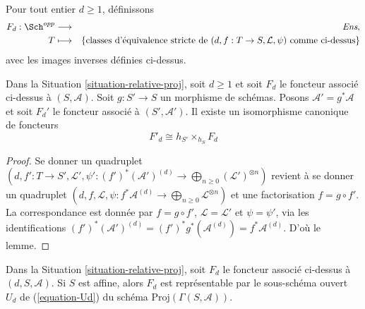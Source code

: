 \medskip\noindent
Pour tout entier $d \geq 1$, définissons
\begin{eqnarray*}
F_d : \Sch^{opp} & \longrightarrow & \textit{Ens}, \\
T & \longmapsto &
\{\text{classes d'équivalence stricte de }
(d, f : T \to S, \mathcal{L}, \psi)
\text{ comme ci-dessus}\}
\end{eqnarray*}
avec les images inverses définies ci-dessus.

\begin{lemma}
\label{lemma-proj-base-change}
Dans la Situation \ref{situation-relative-proj}, soit $d \geq 1$ et soit
$F_d$ le foncteur associé ci-dessus à $(S, \mathcal{A})$.
Soit $g : S' \to S$ un morphisme de schémas. Posons
$\mathcal{A}' = g^*\mathcal{A}$ et soit $F_d'$ le foncteur associé à
$(S', \mathcal{A}')$. Il existe un isomorphisme canonique de foncteurs
$$
F'_d \cong h_{S'} \times_{h_S} F_d
$$
\end{lemma}

\begin{proof}
Se donner un quadruplet
$(d, f' : T \to S', \mathcal{L}',
\psi' : (f')^*(\mathcal{A}')^{(d)} \to
\bigoplus_{n \geq 0} (\mathcal{L}')^{\otimes n})$
revient à se donner un quadruplet
$(d, f, \mathcal{L},
\psi : f^*\mathcal{A}^{(d)} \to
\bigoplus_{n \geq 0} \mathcal{L}^{\otimes n})$
et une factorisation $f = g \circ f'$. La correspondance est donnée par
$f = g \circ f'$, $\mathcal{L} = \mathcal{L}'$ et $\psi = \psi'$, via les
identifications
$(f')^*(\mathcal{A}')^{(d)} = (f')^*g^*(\mathcal{A}^{(d)}) =
f^*\mathcal{A}^{(d)}$. D'où le lemme.
\end{proof}

\begin{lemma}
\label{lemma-relative-proj-affine}
Dans la Situation \ref{situation-relative-proj}, soit $F_d$ le foncteur
associé ci-dessus à $(d, S, \mathcal{A})$. Si $S$ est affine, alors $F_d$
est représentable par le sous-schéma ouvert $U_d$ de (\ref{equation-Ud})
du schéma $\text{Proj}(\Gamma(S, \mathcal{A}))$.
\end{lemma}

